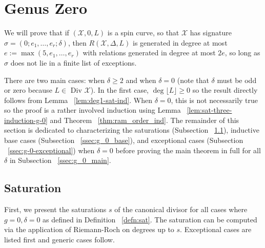 \documentclass{amsart}
\theoremstyle{plain}
\theoremstyle{definition}
\theoremstyle{remark}
\numberwithin{equation}{section}
\newcommand\ssec{\subsection}
\newcommand \sx{\mathscr X}
\newcommand \halfcan{L}
\begin{document}

\section{Genus Zero}
\label{sec:g_0}
We will prove that if $(\sx , 0, \halfcan)$ is a spin curve, so
that $\sx$ has signature $\sigma = (0; e_1, \ldots , e_r; \delta)$,
then $R(\sx , \Delta, L)$ is generated in degree at most $e := \max(
5, e_1, \ldots, e_r)$ with relations generated in degree at most $2e
$, so long as $\sigma$ does not lie in a finite list of exceptions.

There are two main cases: when $\delta \geq 2$ and when $\delta = 0$
 (note that $\delta$ must be odd or zero because $\halfcan \in \text
{ Div } \sx$). In the first case, $\deg \lfloor \halfcan \rfloor
\geq 0$ so the result directly follows from Lemma
~\ref{lem:deg1-sat-ind}. When $\delta = 0$, this is not necessarily
true so the proof is a rather involved induction using Lemma
~\ref{lem:sat-three-induction-g-0} and Theorem ~\ref{thm:ram_order_ind}.
The remainder of this section is dedicated to characterizing the
saturations (Subsection ~\ref{ssec:g_0_saturation}), inductive
base cases (Subsection ~\ref{ssec:g_0_base}), and exceptional
cases (Subsection ~\ref{ssec:g-0-exceptional}) when $\delta = 0$
before proving the main theorem in full for all $\delta$ in
Subsection ~\ref{ssec:g_0_main}.

\ssec{Saturation}
\label{ssec:g_0_saturation}
First, we present the saturations $s$ of the canonical divisor for
all cases where $g = 0, \delta = 0$ as defined in Definition
~\ref{defn:sat}. The saturation can be computed via the application
of Riemann-Roch on degrees up to $s$. Exceptional cases are listed
first and generic cases follow.
\end{document}
